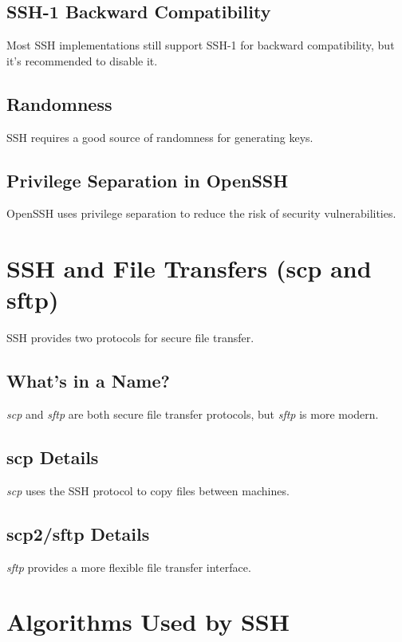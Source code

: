 \documentclass[12pt]{book}
\begin{document}
\subsection{SSH-1 Backward Compatibility}

Most SSH implementations still support SSH-1 for backward compatibility, but it's recommended to disable it.

\subsection{Randomness}

SSH requires a good source of randomness for generating keys.

\subsection{Privilege Separation in OpenSSH}

OpenSSH uses privilege separation to reduce the risk of security vulnerabilities.

\section{SSH and File Transfers (scp and sftp)}

SSH provides two protocols for secure file transfer.

\subsection{What's in a Name?}

\textit{scp} and \textit{sftp} are both secure file transfer protocols, but \textit{sftp} is more modern.

\subsection{scp Details}

\textit{scp} uses the SSH protocol to copy files between machines.

\subsection{scp2/sftp Details}

\textit{sftp} provides a more flexible file transfer interface.

\section{Algorithms Used by SSH}
\end{document}
